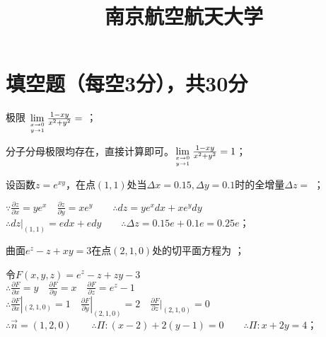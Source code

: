 \documentclass{exam-zh}
\title{南京航空航天大学}
\begin{document}
\maketitle

\section{填空题（每空3分），共30分}
\scoringbox

\begin{question}[points = 3]
    极限 $\lim\limits_{x \to 0 \atop y \to 1} \frac{1 - xy}{x^2 + y^2} = $ \fillin[1]；
\end{question}
\begin{solution}
    分子分母极限均存在，直接计算即可。$\lim\limits_{x \to 0 \atop y \to 1} \frac{1 - xy}{x^2 + y^2} = 1$；
\end{solution}

\begin{question}[points = 3]
    设函数$z = e^{xy}$，在点$\left(1, 1\right)$处当$\Delta x = 0.15, \Delta y = 0.1$时的全增量$\Delta z = $ \fillin[$0.25e$]；
\end{question}
\begin{solution}
    $\because \frac{\partial z}{\partial x} = ye^x \quad \frac{\partial z}{\partial y} = xe^y \qquad
        \therefore dz = ye^xdx + xe^ydy$ \\
    $\therefore dz|_{\left(1, 1\right)} = edx + edy \qquad
        \therefore \Delta z = 0.15e + 0.1e = 0.25e$；
\end{solution}

\begin{question}[points = 3]
    曲面$e^z - z + xy = 3$在点$\left(2, 1, 0\right)$处的切平面方程为 \fillin[$x + 2y = 4$]；
\end{question}
\begin{solution}
    令$F\left(x, y, z\right) = e^z - z + zy - 3$ \\
    $\therefore \frac{\partial F}{\partial x} = y \quad \frac{\partial F}{\partial y} = x \quad \frac{\partial F}{\partial z} = e^z - 1$ \\
    $\therefore \frac{\partial F}{\partial x}|_{\left(2, 1, 0\right)} = 1 \quad
        \frac{\partial F}{\partial y}|_{\left(2, 1, 0\right)} = 2 \quad
        \frac{\partial F}{\partial z}|_{\left(2, 1, 0\right)} = 0$ \\
    $\therefore \vec{n} = \left(1, 2, 0\right) \qquad
     \therefore \Pi: \left(x - 2\right) + 2\left(y - 1\right) = 0 \qquad
     \therefore \Pi: x + 2y = 4$；
\end{solution}
\end{document}
